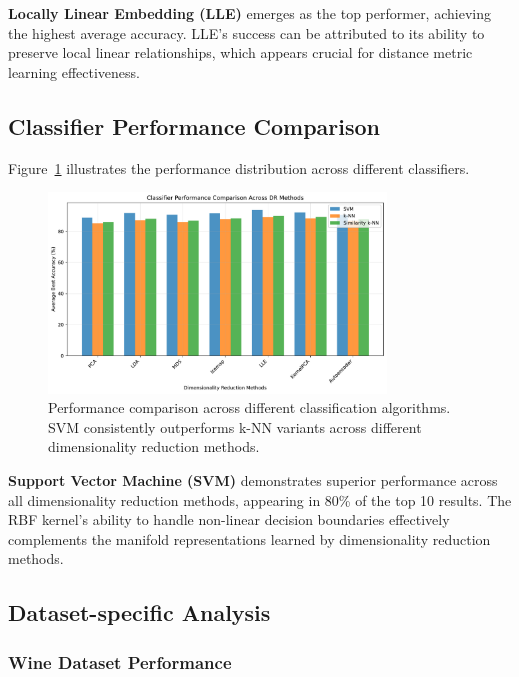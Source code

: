 \documentclass[review]{elsarticle}
\begin{document}
\textbf{Locally Linear Embedding (LLE)} emerges as the top performer, achieving the highest average accuracy. LLE's success can be attributed to its ability to preserve local linear relationships, which appears crucial for distance metric learning effectiveness.

\subsection{Classifier Performance Comparison}

Figure~\ref{fig:classifier_comparison} illustrates the performance distribution across different classifiers.

\begin{figure}[h]
\centering
\includegraphics[width=0.8\textwidth]{../python/results/plots/classifier_comparison.pdf}
\caption{Performance comparison across different classification algorithms. SVM consistently outperforms k-NN variants across different dimensionality reduction methods.}
\label{fig:classifier_comparison}
\end{figure}

\textbf{Support Vector Machine (SVM)} demonstrates superior performance across all dimensionality reduction methods, appearing in 80\% of the top 10 results. The RBF kernel's ability to handle non-linear decision boundaries effectively complements the manifold representations learned by dimensionality reduction methods.

\subsection{Dataset-specific Analysis}

\subsubsection{Wine Dataset Performance}
\end{document}

